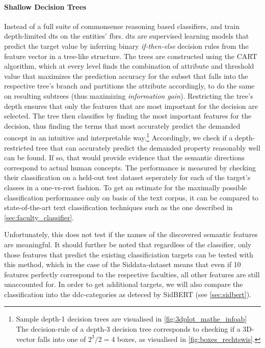 \paragraph{Shallow Decision Trees} Instead of a full suite of commonsense reasoning based classifiers, \cite{Ager2018} and \cite{Alshaikh2020} train depth-limited \glspl{dt} \cite{breiman1984classification} on the entities' \glspl{fbr}. \Glspl{dt} are supervised learning models that predict the target value by inferring binary \textit{if-then-else} decision rules from the feature vector in a tree-like structure. The trees are constructed using the CART algorithm, which at every level finds the combination of attribute and threshold value that maximizes the prediction accuracy for the subset that falls into the respective tree's branch and partitions the attribute accordingly, to do the same on resulting subtrees (thus maximizing \emph{information gain}). %
Restricting the tree's depth ensures that only the features that are most important for the decision are selected. The tree then classifies by finding the most important features for the decision, thus finding the terms that most accurately predict the demanded concept in an intuitive and interpretable way.\footnote{Sample depth-1 decision trees are visualised in \autoref{fig:3dplot_mathe_infoab} The decision-rule of a depth-3 decision tree corresponds to checking if a 3D-vector falls into one of $2^3/2=4$ boxes, as visualised in \autoref{fig:boxes_rechtswis}.} Accordingly, we check if a depth-restricted tree that can accurately predict the demanded property reasonably well can be found. If so, that would provide evidence that the semantic directions correspond to actual human concepts. The performance is measured by checking their classification on a held-out test dataset seperately for each of the target's classes in a one-vs-rest fashion. To get an estimate for the maximally possible classification performance only on basis of the text corpus, it can be compared to state-of-the-art text classification techniques such as the one described in \autoref{sec:faculty_classifier}.

Unfortunately, this does not test if the names of the discovered semantic features are meaningful. It should further be noted that regardless of the classifier, only those features that predict the existing classificiation targets can be tested with this method, which in the case of the Siddata-dataset means that even if 10 features perfectly correspond to the respective faculties, all other features are still unaccounted for. In order to get additional targets, we will also compare the classification into the \gls{ddc}-categories as deteced by SidBERT (see \autoref{sec:sidbert}).

